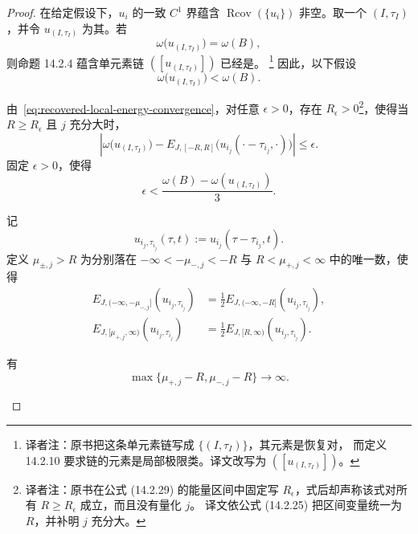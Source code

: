 \begin{proof}
在给定假设下，$u_i$ 的一致 $C^1$ 界蕴含
$\operatorname{Rcov}(\{u_i\})$ 非空。取一个\termRecoveringPair{}
$(I,\tau_I)$，并令 $u_{(I,\tau_I)}$ 为其\termLocalLimit{}。若
\[
  \omega\bigl(u_{(I,\tau_I)}\bigr)=\omega(B),
\]
则命题 14.2.4 蕴含单元素链
$([u_{(I,\tau_I)}])$ 已经是\termMaximalChain{}。
\footnote{译者注：原书把这条单元素链写成 $\{(I,\tau_I)\}$，其元素是恢复对，
而定义 14.2.10 要求链的元素是局部极限类。译文改写为
$([u_{(I,\tau_I)}])$。}
因此，以下假设
\begin{equation}
  \omega\bigl(u_{(I,\tau_I)}\bigr)<\omega(B).
\label{eq:recovered-energy-deficit}
\end{equation}

由~\eqref{eq:recovered-local-energy-convergence}，对任意 $\epsilon>0$，存在
$R_\epsilon>0$\footnote{译者注：原书在公式 (14.2.29) 的能量区间中固定写
$R_\epsilon$，式后却声称该式对所有 $R\geq R_\epsilon$ 成立，而且没有量化 $j$。
译文依公式 (14.2.25) 把区间变量统一为 $R$，并补明 $j$ 充分大。}，使得当
$R\geq R_\epsilon$ 且 $j$ 充分大时，
\begin{equation}
  \left|
    \omega\bigl(u_{(I,\tau_I)}\bigr)
    -E_{J,[-R,R]}
      \bigl(u_{i_j}(\mathord\cdot-\tau_{i_j},\mathord\cdot)\bigr)
  \right|
  \leq\epsilon.
\label{eq:recovered-energy-window}
\end{equation}
固定 $\epsilon>0$，使得
\[
  \epsilon<
  \frac{\omega(B)-\omega(u_{(I,\tau_I)})}{3}.
\]

记
\[
  u_{i_j,\tau_{i_j}}(\tau,t)
  :=u_{i_j}(\tau-\tau_{i_j},t).
\]
定义 $\mu_{\pm,j}>R$ 为分别落在
$-\infty<-\mu_{-,j}<-R$ 与 $R<\mu_{+,j}<\infty$ 中的唯一数，使得
\begin{equation}
  \begin{aligned}
  E_{J,(-\infty,-\mu_{-,j}]}
    (u_{i_j,\tau_{i_j}})
  &=\frac12E_{J,(-\infty,-R]}
    (u_{i_j,\tau_{i_j}}),\\
  E_{J,[\mu_{+,j},\infty)}
    (u_{i_j,\tau_{i_j}})
  &=\frac12E_{J,[R,\infty)}
    (u_{i_j,\tau_{i_j}}).
  \end{aligned}
\label{eq:half-tail-energy-cutoffs}
\end{equation}

\begin{lemma}
\label{lem:tail-cutoff-divergence}
有
\[
  \max\{\mu_{+,j}-R,\mu_{-,j}-R\}\longrightarrow\infty.
\]
\end{lemma}


\end{proof}
